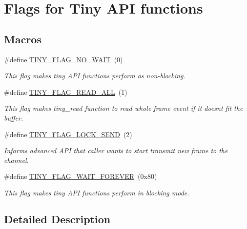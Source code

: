 \hypertarget{group__FLAGS__GROUP}{}\section{Flags for Tiny A\+PI functions}
\label{group__FLAGS__GROUP}
\subsection*{Macros}
\begin{DoxyCompactItemize}
\item 
\mbox{\label{group__FLAGS__GROUP_gadadd60eb21d7949e6d097ad36aab9b2e}} 
\#define \hyperlink{group__FLAGS__GROUP_gadadd60eb21d7949e6d097ad36aab9b2e}{T\+I\+N\+Y\+\_\+\+F\+L\+A\+G\+\_\+\+N\+O\+\_\+\+W\+A\+IT}~(0)
\begin{DoxyCompactList}\small\item\em This flag makes tiny A\+PI functions perform as non-\/blocking. \end{DoxyCompactList}\item 
\mbox{\label{group__FLAGS__GROUP_gae41123cfeed375e618a4152c9bbd0d6d}} 
\#define \hyperlink{group__FLAGS__GROUP_gae41123cfeed375e618a4152c9bbd0d6d}{T\+I\+N\+Y\+\_\+\+F\+L\+A\+G\+\_\+\+R\+E\+A\+D\+\_\+\+A\+LL}~(1)
\begin{DoxyCompactList}\small\item\em This flag makes tiny\+\_\+read function to read whole frame event if it doesn\textquotesingle{}t fit the buffer. \end{DoxyCompactList}\item 
\mbox{\label{group__FLAGS__GROUP_ga593e3353339a36dcd0746057e2864958}} 
\#define \hyperlink{group__FLAGS__GROUP_ga593e3353339a36dcd0746057e2864958}{T\+I\+N\+Y\+\_\+\+F\+L\+A\+G\+\_\+\+L\+O\+C\+K\+\_\+\+S\+E\+ND}~(2)
\begin{DoxyCompactList}\small\item\em Informs advanced A\+PI that caller wants to start transmit new frame to the channel. \end{DoxyCompactList}\item 
\mbox{\label{group__FLAGS__GROUP_ga3a34267804581c5709d03f52d232b307}} 
\#define \hyperlink{group__FLAGS__GROUP_ga3a34267804581c5709d03f52d232b307}{T\+I\+N\+Y\+\_\+\+F\+L\+A\+G\+\_\+\+W\+A\+I\+T\+\_\+\+F\+O\+R\+E\+V\+ER}~(0x80)
\begin{DoxyCompactList}\small\item\em This flag makes tiny A\+PI functions perform in blocking mode. \end{DoxyCompactList}\end{DoxyCompactItemize}


\subsection{Detailed Description}
